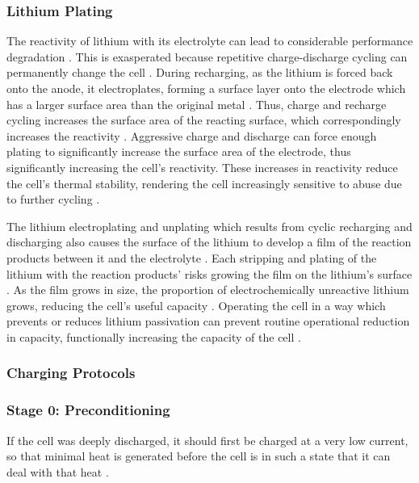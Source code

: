 \subsubsection{Lithium Plating}
The reactivity of lithium with its electrolyte can lead to considerable performance degradation \cite{HANDBOOK}. 
This is exasperated because repetitive charge-discharge cycling can permanently change the cell \cite{HANDBOOK}.
During recharging, as the lithium is forced back onto the anode, it electroplates, forming a surface layer onto the electrode which has a larger surface area than the original metal \cite{HANDBOOK}. 
Thus, charge and recharge cycling increases the surface area of the reacting surface, which correspondingly increases the reactivity \cite{HANDBOOK}. 
Aggressive charge and discharge can force enough plating to significantly increase the surface area of the electrode, thus significantly increasing the cell's reactivity.
These increases in reactivity reduce the cell's thermal stability, rendering the cell increasingly sensitive to abuse due to further cycling \cite{HANDBOOK}.

The lithium electroplating and unplating which results from cyclic recharging and discharging also causes the surface of the lithium to develop a film of the reaction products between it and the electrolyte \cite{HANDBOOK}. 
Each stripping and plating of the lithium with the reaction products' risks growing the film on the lithium's surface \cite{HANDBOOK}. 
As the film grows in size, the proportion of electrochemically unreactive lithium grows, reducing the cell's useful capacity \cite{HANDBOOK}.
Operating the cell in a way which prevents or reduces lithium passivation can prevent routine operational reduction in capacity, functionally increasing the capacity of the cell \cite{HANDBOOK}.

\subsubsection{Charging Protocols}

\subsubsection*{Stage 0: Preconditioning}

If the cell was deeply discharged, it should first be charged at a very low current, so that minimal heat is generated before the cell is in such a state that it can deal with that heat \cite{DIGIKEY}.


